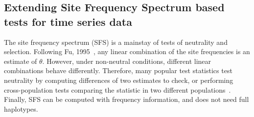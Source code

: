 \documentclass[11pt]{article}
\begin{document}
\subsection{Extending Site Frequency Spectrum  based tests for  time series data}
\label{sec:sfs-ts}
The site frequency spectrum (SFS) is a mainstay of tests of neutrality
and selection. Following Fu, 1995~\cite{fu1995statistical}, any linear combination
of the site frequencies is an estimate of $\theta$. However, under
non-neutral conditions, different linear combinations behave
differently. Therefore, many popular test statistics test neutrality
by computing differences of two estimates to check, or performing
cross-population tests comparing the statistic in two different
populations~\cite{achaz2009frequency,ronen2013learning,sabeti2007genome}. Finally, SFS can be computed
with frequency information, and does not need full haplotypes.
\end{document}
